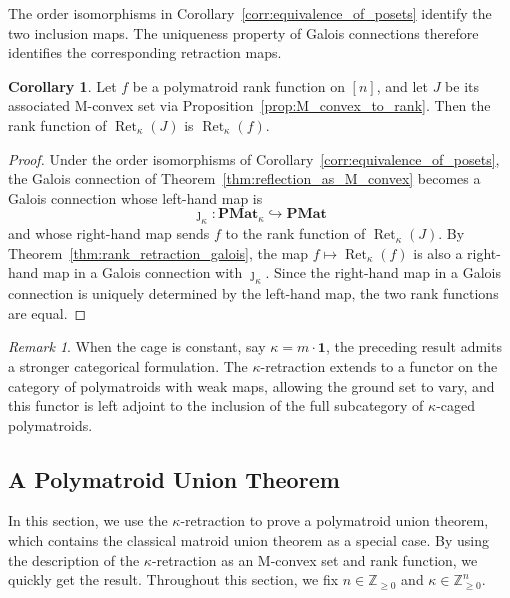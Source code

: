 \documentclass[11pt]{article}
\theoremstyle{definition}
\newtheorem{corollary}[theorem]{Corollary}
\theoremstyle{remark}
\newtheorem{remark}[theorem]{Remark}
\newcommand{\Zgeq}{\mathbb{Z}_{\geq 0}}       %
\newcommand{\Zgeqn}{\mathbb{Z}_{\geq 0}^n}     %
\newcommand{\ones}{\textbf{1}}
\newcommand{\PMat}{\mathbf{PMat}}      %
\newcommand{\PMatK}{\mathbf{PMat}_\kappa}
\DeclareMathOperator{\Ret}{Ret}                %
\newcommand{\RetK}{\Ret_{\kappa}}              %
\begin{document}
The order isomorphisms in
Corollary~\ref{corr:equivalence_of_posets} identify the two inclusion
maps. The uniqueness property of Galois connections therefore identifies
the corresponding retraction maps.

\begin{corollary}\label{cor:both_reflections_same}
    Let $f$ be a polymatroid rank function on $[n]$, and let $J$ be its
    associated M-convex set via
    Proposition~\ref{prop:M_convex_to_rank}. Then the rank function of
    $\RetK(J)$ is $\RetK(f)$.
\end{corollary}

\begin{proof}
    Under the order isomorphisms of
    Corollary~\ref{corr:equivalence_of_posets}, the Galois connection of
    Theorem~\ref{thm:reflection_as_M_convex} becomes a Galois connection whose
    left-hand map is
    \[
        \jmath_\kappa\colon\PMatK\hookrightarrow\PMat
    \]
    and whose right-hand map sends $f$ to the rank function of $\RetK(J)$.
    By Theorem~\ref{thm:rank_retraction_galois}, the map
    $f\mapsto\RetK(f)$ is also a right-hand map in a Galois connection with
    $\jmath_\kappa$. Since the right-hand map in a Galois connection is
    uniquely determined by the left-hand map, the two rank functions are
    equal.
\end{proof}

\begin{remark}\label{remark:categorical_retraction}
    When the cage is constant, say $\kappa=m\cdot \ones$, the preceding result admits
    a stronger categorical formulation. The $\kappa$-retraction extends to a
    functor on the category of polymatroids with weak maps, allowing the ground
    set to vary, and this functor is left adjoint to the inclusion of the full
    subcategory of $\kappa$-caged polymatroids.
\end{remark}

\subsection{A Polymatroid Union Theorem}

In this section, we use the $\kappa$-retraction to prove a polymatroid union
theorem, which contains the classical matroid union theorem as a special
case. By using the description of the $\kappa$-retraction as an M-convex set
and rank function, we quickly get the result. Throughout this section, we
fix $n\in\Zgeq$ and $\kappa\in\Zgeqn$.
\end{document}
